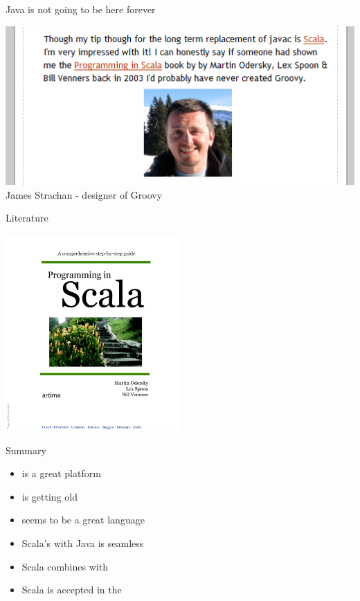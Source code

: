 \begin{frame}{Java is not going to be here forever}
\begin{center}
\includegraphics[scale=0.8]{resources/JamesStrachanScala.png}\\
James Strachan - designer of Groovy
\end{center}
\end{frame}

\begin{frame}{Literature}
\begin{center}
\includegraphics[width=0.5\textwidth]{resources/ProgrammingInScala.png}
\end{center}
\end{frame}

\begin{frame}{Summary}
\begin{itemize}
  \item {} is a great platform
  \item {} is getting old
  \item {} seems to be a great language
  \item Scala's  with Java is seamless
  \item Scala combines  with 
  \item Scala is accepted in the 
\end{itemize}
\end{frame}







